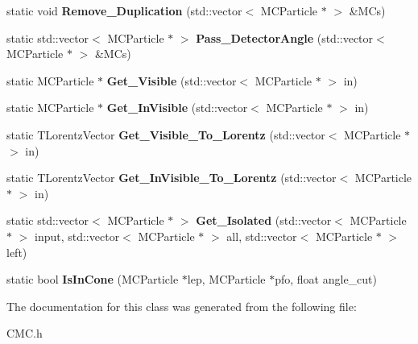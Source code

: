 \begin{DoxyCompactItemize}
\item 
\hypertarget{classToolSet_1_1CMC_acd7611ff7cc945f5d198c0c0ba0b50c2}{
static void {\bfseries Remove\_\-Duplication} (std::vector$<$ MCParticle $\ast$ $>$ \&MCs)}
\label{classToolSet_1_1CMC_acd7611ff7cc945f5d198c0c0ba0b50c2}

\item 
\hypertarget{classToolSet_1_1CMC_ac483834b1710a1c4797f3b55f8f2336b}{
static std::vector$<$ MCParticle $\ast$ $>$ {\bfseries Pass\_\-DetectorAngle} (std::vector$<$ MCParticle $\ast$ $>$ \&MCs)}
\label{classToolSet_1_1CMC_ac483834b1710a1c4797f3b55f8f2336b}

\item 
\hypertarget{classToolSet_1_1CMC_a37d3453a48a49082beb6f65827fc94b4}{
static MCParticle $\ast$ {\bfseries Get\_\-Visible} (std::vector$<$ MCParticle $\ast$ $>$ in)}
\label{classToolSet_1_1CMC_a37d3453a48a49082beb6f65827fc94b4}

\item 
\hypertarget{classToolSet_1_1CMC_a89441427db18fc75e777966d5ac169b7}{
static MCParticle $\ast$ {\bfseries Get\_\-InVisible} (std::vector$<$ MCParticle $\ast$ $>$ in)}
\label{classToolSet_1_1CMC_a89441427db18fc75e777966d5ac169b7}

\item 
\hypertarget{classToolSet_1_1CMC_a0754f20765709b34841b3c3aec8c7e51}{
static TLorentzVector {\bfseries Get\_\-Visible\_\-To\_\-Lorentz} (std::vector$<$ MCParticle $\ast$ $>$ in)}
\label{classToolSet_1_1CMC_a0754f20765709b34841b3c3aec8c7e51}

\item 
\hypertarget{classToolSet_1_1CMC_ab44cceb872950622551735a97a23bd4d}{
static TLorentzVector {\bfseries Get\_\-InVisible\_\-To\_\-Lorentz} (std::vector$<$ MCParticle $\ast$ $>$ in)}
\label{classToolSet_1_1CMC_ab44cceb872950622551735a97a23bd4d}

\item 
\hypertarget{classToolSet_1_1CMC_af7da55fa17ab746930f3a04eeb3014ef}{
static std::vector$<$ MCParticle $\ast$ $>$ {\bfseries Get\_\-Isolated} (std::vector$<$ MCParticle $\ast$ $>$ input, std::vector$<$ MCParticle $\ast$ $>$ all, std::vector$<$ MCParticle $\ast$ $>$ left)}
\label{classToolSet_1_1CMC_af7da55fa17ab746930f3a04eeb3014ef}

\item 
\hypertarget{classToolSet_1_1CMC_a4594f7a35f5db952f142626100ced91f}{
static bool {\bfseries IsInCone} (MCParticle $\ast$lep, MCParticle $\ast$pfo, float angle\_\-cut)}
\label{classToolSet_1_1CMC_a4594f7a35f5db952f142626100ced91f}

\end{DoxyCompactItemize}


The documentation for this class was generated from the following file:\begin{DoxyCompactItemize}
\item 
CMC.h\end{DoxyCompactItemize}
